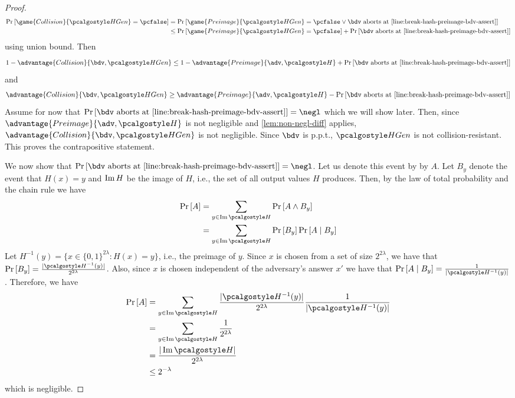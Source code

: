\begin{proof}
  \begin{align*}
  \pr{\game{Collision}{\algo{HGen}} = \pcfalse} &= \pr{\game{Preimage}{\algo{HGen}} = \pcfalse \vee \bdv \text{ aborts at \cref{line:break-hash-preimage-bdv-assert}} } \\
  &\le \pr{\game{Preimage}{\algo{HGen}} = \pcfalse} + \pr{\bdv \text{ aborts at \cref{line:break-hash-preimage-bdv-assert}} } \\
  \end{align*}
  using union bound.
  Then
  \begin{align*}
    1 - \advantage{Collision}{\bdv, \algo{HGen}} &\le 1 - \advantage{Preimage}{\adv, \algo{H}} + \pr{\bdv \text{ aborts at \cref{line:break-hash-preimage-bdv-assert}} }\\
  \end{align*}
  and
  \begin{align*}
    \advantage{Collision}{\bdv, \algo{HGen}} &\ge \advantage{Preimage}{\adv, \algo{H}} - \pr{\bdv \text{ aborts at \cref{line:break-hash-preimage-bdv-assert}} }\\
  \end{align*}
  Assume for now that $\pr{\bdv \text{ aborts at \cref{line:break-hash-preimage-bdv-assert}} } = \negl$ which we will show later.
  Then, since $\advantage{Preimage}{\adv, \algo{H}}$ is not negligible and \cref{lem:non-negl-diff} applies,
  $\advantage{Collision}{\bdv, \algo{HGen}}$ is not negligible.
  Since $\bdv$ is p.p.t., $\algo{HGen}$ is not collision-resistant.
  This proves the contrapositive statement.

  We now show that $\pr{\bdv \text{ aborts at \cref{line:break-hash-preimage-bdv-assert}} } = \negl$.
  Let us denote this event by by $A$.
  Let $B_y$ denote the event that $H(x) = y$ and $\operatorname{Im} H$ be the image of $H$, i.e., the set of all output values $H$ produces.
  Then, by the law of total probability and the chain rule we have
  \begin{align*}
    \pr{A} &= \sum_{y \in \Ima \algo{H}} \pr{A \wedge B_y} \\
           &= \sum_{y \in \Ima \algo{H}} \pr{B_y} \pr{A \mid B_y}
  \end{align*}
  Let $H^{-1}(y) = \{x \in \{0, 1\}^{2\lambda} : H(x) = y\}$, i.e., the preimage of $y$.
  Since $x$ is chosen from a set of size $2^{2\lambda}$, we have that $\pr{B_y} = \frac{|\algo{H}^{-1}(y)|} {2^{2\lambda}}$.
  Also, since $x$ is chosen independent of the adversary's answer $x'$ we have that $\pr{A \mid B_y} = \frac{1}{|\algo{H}^{-1}(y)|}$.
  Therefore, we have
  \begin{align*}
    \pr{A} &= \sum_{y \in \Ima \algo{H}} \frac{|\algo{H}^{-1}(y)|} {2^{2\lambda}} \frac{1}{|\algo{H}^{-1}(y)|}  \\
           &= \sum_{y \in \Ima \algo{H}} \frac{1} {2^{2\lambda}} \\
           &= \frac{|\Ima \algo{H}|} {2^{2\lambda}} \\
           &\le 2^{-\lambda} \\
  \end{align*}
  which is negligible.
\end{proof}



